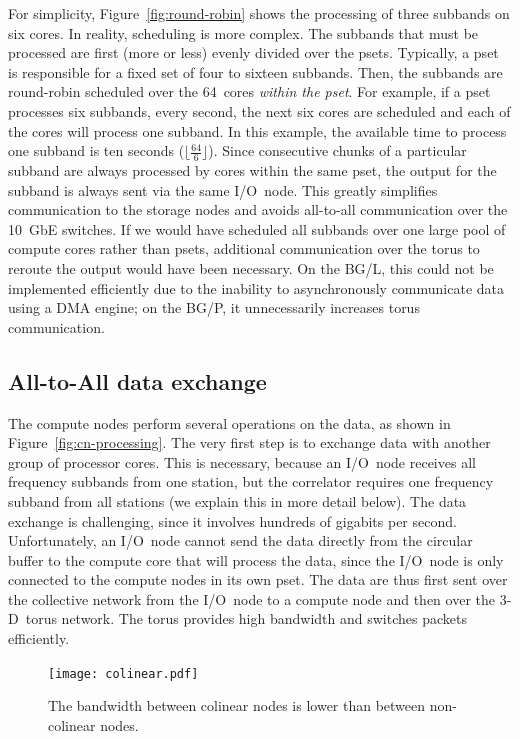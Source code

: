 \documentclass{sig-alternate}
\begin{document}
For simplicity, Figure~\ref{fig:round-robin} shows the processing of
three subbands on six cores.
In reality, scheduling is more complex.
The subbands that must be processed are first (more or less) evenly divided
over the psets.
Typically, a pset is responsible for a fixed set of four to sixteen subbands.
Then, the subbands are round-robin scheduled over the 64~cores \emph{within the
pset}.
For example, if a pset processes six subbands, every second, the next six
cores are scheduled and each of the cores will process one subband.
In this example, the available time to process one subband is ten seconds
($\lfloor\frac{64}{6}\rfloor$).
Since consecutive chunks of a particular subband are always processed by cores
within the same pset, the output for the subband is always sent via the same
I/O~node.
This greatly simplifies communication to the storage nodes and avoids
all-to-all communication over the 10~GbE switches.
If we would have scheduled all subbands over one large pool of compute cores
rather than psets, additional communication over the torus to reroute the
output would have been necessary.
On the BG/L, this could not be implemented efficiently due to the
inability to asynchronously communicate data using a DMA engine; on the
BG/P, it unnecessarily increases torus communication.


\subsection{All-to-All data exchange}
\label{all-to-all}

The compute nodes perform several operations on the data, as shown in
Figure~\ref{fig:cn-processing}.
The very first step is to exchange data with another group of processor cores.
This is necessary, because an I/O~node receives all frequency subbands from one
station, but the correlator requires one frequency subband from all
stations (we explain this in more detail below).
The data exchange is challenging, since it involves hundreds of gigabits per
second.
Unfortunately, an I/O~node cannot send the data directly from the circular
buffer to the compute core that will process the data, since the I/O~node is
only connected to the compute nodes in its own pset.
The data are thus first sent over the collective network from the I/O~node to
a compute node and then over the 3-D~torus network.
The torus provides high bandwidth and switches packets efficiently.

\begin{figure}[ht]
\begin{center}
\texttt{[image: colinear.pdf]}
\end{center}
\vspace{-0.5cm}
\caption{The bandwidth between colinear nodes is lower than between
non-colinear nodes.}
\label{fig:colinear}
\end{figure}
\end{document}
